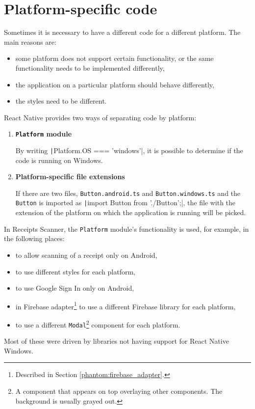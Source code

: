 \documentclass[
  digital, %
  table,   %
  oneside, %
  lof,     %
  lot,     %
]{fithesis3}
\newcommand{\code}[1]{\texttt|#1|} %
\begin{document}
\section{Platform-specific code}
\label{sec:platform_specific_code}
Sometimes it is necessary to have a different code for a different platform. The main reasons are:
\begin{itemize}
\item some platform does not support certain functionality, or the same functionality needs to be implemented differently,
\item the application on a particular platform should behave differently,
\item the styles need to be different.
\end{itemize}

React Native provides two ways of separating code by platform:
\begin{enumerate}
\item \textbf{\texttt{Platform} module}
    
    By writing \code{Platform.OS === 'windows'}, it is possible to determine if the code is running on Windows.
\item \textbf{Platform-specific file extensions}

    If there are two files, \texttt{Button.android.ts} and \texttt{Button.windows.ts} and the \texttt{Button} is imported as \code{import Button from './Button';}‚ the file with the extension of the platform on which the application is running will be picked.
\end{enumerate}

In Receipts Scanner, the \texttt{Platform} module's functionality is used, for example, in the following places:
\begin{itemize}
    \item to allow scanning of a receipt only on Android,
    \item to use different styles for each platform,
    \item to use Google Sign In only on Android,
    \item in Firebase adapter\footnote{Described in Section \ref{phantom:firebase_adapter}.} to use a different Firebase library for each platform,
    \item to use a different \texttt{Modal}\footnote{A component that appears on top overlaying other components. The background is usually grayed out.} component for each platform.
\end{itemize}
Most of these were driven by libraries not having support for React Native Windows.
\end{document}
